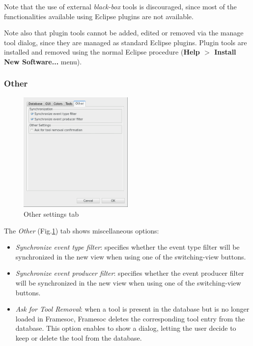 \documentclass[twoside]{article}
\begin{document}
\begin{sloppypar}
Note that the use of external \emph{black-box} tools is discouraged, since most of the functionalities available using Eclipse plugins are not available.

Note also that plugin tools cannot be added, edited or removed via the manage tool dialog, since they are managed as standard Eclipse plugins.
Plugin tools are installed and removed using the normal Eclipse procedure (\textbf{Help $>$ Install New Software...} menu). 

\subsubsection{Other}
\label{conf_other}
\begin{figure}[h!]
  \centering
    \includegraphics[width=0.5\textwidth]{images/conf_other.png}
  \caption{Other settings tab}
  \label{fig:other_tab}
\end{figure}

The \emph{Other} (Fig.\ref{fig:other_tab}) tab shows miscellaneous options: 
\begin{itemize}
	\item \emph{Synchronize event type filter}: specifies whether the event type filter will be synchronized in the new view when using one of the switching-view buttons.
	\item \emph{Synchronize event producer filter}: specifies whether the event producer filter will be synchronized in the new view when using one of the switching-view buttons.
	\item \emph{Ask for Tool Removal}: when a tool is present in the database but is no longer loaded in Framesoc, Framesoc deletes the corresponding tool entry from the database. This option enables to show a dialog, letting the user decide to keep or delete the tool from the database.
\end{itemize}




\end{sloppypar}
\end{document}
